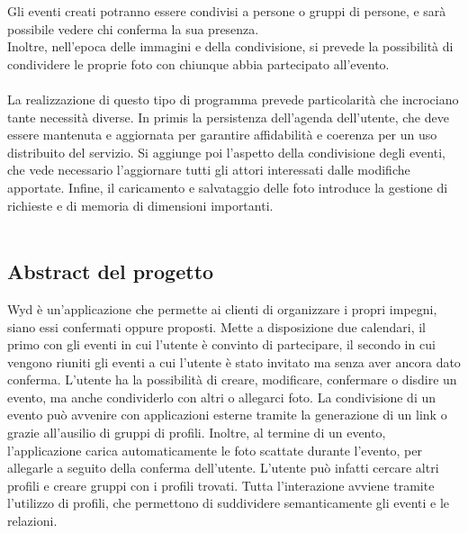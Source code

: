 Gli eventi creati potranno essere condivisi a persone o gruppi di persone, e sarà possibile vedere chi conferma la sua presenza.\\
Inoltre, nell'epoca delle immagini e della condivisione, si prevede la possibilità di condividere le proprie foto con chiunque abbia partecipato all'evento.\\
\\
La realizzazione di questo tipo di programma prevede particolarità che incrociano tante necessità diverse.
In primis la persistenza dell'agenda dell'utente, che deve essere mantenuta e aggiornata per garantire affidabilità e coerenza per un uso distribuito del servizio.
Si aggiunge poi l'aspetto della condivisione degli eventi, che vede necessario l'aggiornare tutti gli attori interessati dalle modifiche apportate.
Infine, il caricamento e salvataggio delle foto introduce la gestione di richieste e di memoria di dimensioni importanti.\\
\\
\clearpage

\subsection{Abstract del progetto}

Wyd è un'applicazione che permette ai clienti di organizzare i propri impegni, siano essi confermati oppure proposti.\newline
Mette a disposizione due calendari, il primo con gli eventi in cui l'utente è convinto di partecipare, 
il secondo in cui vengono riuniti gli eventi a cui l'utente è stato invitato ma senza aver ancora dato conferma.\newline
L'utente ha la possibilità di creare, modificare, confermare o disdire un evento, ma anche condividerlo con altri o allegarci foto.
La condivisione di un evento può avvenire con applicazioni esterne tramite la generazione di un link o grazie all'ausilio di gruppi di profili.
Inoltre, al termine di un evento, l'applicazione carica automaticamente le foto scattate durante l'evento, per allegarle a seguito della conferma dell'utente.\newline  
L'utente può infatti cercare altri profili e creare gruppi con i profili trovati.\newline
Tutta l'interazione avviene tramite l'utilizzo di profili, che permettono di suddividere semanticamente gli eventi e le relazioni.\newline

\newpage